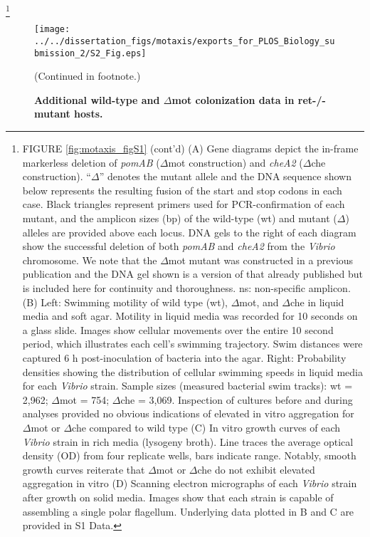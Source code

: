 {{{{{{{{\let\thefootnote\relax\footnote{FIGURE \ref{fig:motaxis_figS1} (cont'd) (A) Gene diagrams depict the in-frame markerless deletion of \textit{pomAB} ($\Delta$mot construction) and \textit{cheA2} ($\Delta$che construction). ``$\Delta$'' denotes the mutant allele and the DNA sequence shown below represents the resulting fusion of the start and stop codons in each case. Black triangles represent primers used for PCR-confirmation of each mutant, and the amplicon sizes (bp) of the wild-type (wt) and mutant ($\Delta$) alleles are provided above each locus. DNA gels to the right of each diagram show the successful deletion of both \textit{pomAB} and \textit{cheA2} from the \textit{Vibrio} chromosome. We note that the $\Delta$mot mutant was constructed in a previous publication \cite{wiles_modernized_2018} and the DNA gel shown is a version of that already published but is included here for continuity and thoroughness. ns: non-specific amplicon. (B) Left: Swimming motility of wild type (wt), $\Delta$mot, and $\Delta$che in liquid media and soft agar. Motility in liquid media was recorded for 10 seconds on a glass slide. Images show cellular movements over the entire 10 second period, which illustrates each cell's swimming trajectory. Swim distances were captured 6 h post-inoculation of bacteria into the agar. Right: Probability densities showing the distribution of cellular swimming speeds in liquid media for each \textit{Vibrio} strain. Sample sizes (measured bacterial swim tracks): wt = 2,962; $\Delta$mot = 754; $\Delta$che = 3,069. Inspection of cultures before and during analyses provided no obvious indications of elevated in vitro aggregation for $\Delta$mot or $\Delta$che compared to wild type  (C) In vitro growth curves of each \textit{Vibrio} strain in rich media (lysogeny broth). Line traces the average optical density (OD) from four replicate wells, bars indicate range. Notably, smooth growth curves reiterate that $\Delta$mot or $\Delta$che do not exhibit elevated aggregation in vitro  (D) Scanning electron micrographs of each \textit{Vibrio} strain after growth on solid media. Images show that each strain is capable of assembling a single polar flagellum. Underlying data plotted in B and C are provided in S1 Data.}

\newpage

\begin{figure}%
	\centerline{
		\texttt{[image: ../../dissertation\_figs/motaxis/exports\_for\_PLOS\_Biology\_submission\_2/S2\_Fig.eps]}}
	\caption{\textbf{Additional wild-type and $\Delta$mot colonization data in ret-/- mutant hosts.}}{(Continued in footnote.)}
	\label{fig:motaxis_figS2}
\end{figure}

}}}}}}}}
